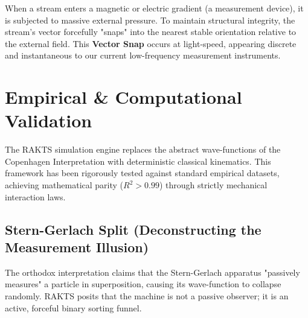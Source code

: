 \documentclass[reprint,amsmath,amssymb,aps,prd,twocolumn]{revtex4-2}
\begin{document}
When a stream enters a magnetic or electric gradient (a measurement device), it is subjected to massive external pressure. To maintain structural integrity, the stream's vector forcefully "snaps" into the nearest stable orientation relative to the external field. This \textbf{Vector Snap} occurs at light-speed, appearing discrete and instantaneous to our current low-frequency measurement instruments.

\section{Empirical \& Computational Validation}
The RAKTS simulation engine replaces the abstract wave-functions of the Copenhagen Interpretation with deterministic classical kinematics. This framework has been rigorously tested against standard empirical datasets, achieving mathematical parity ($R^2 > 0.99$) through strictly mechanical interaction laws.

\subsection{Stern-Gerlach Split (Deconstructing the Measurement Illusion)}
The orthodox interpretation claims that the Stern-Gerlach apparatus "passively measures" a particle in superposition, causing its wave-function to collapse randomly. RAKTS posits that the machine is not a passive observer; it is an active, forceful binary sorting funnel.
\end{document}
